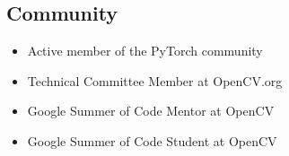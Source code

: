 \subsection{Community}
\begin{itemize}
\item Active member of the PyTorch community
\item Technical Committee Member at OpenCV.org
\item Google Summer of Code Mentor at OpenCV
\item Google Summer of Code Student at OpenCV
\end{itemize}
